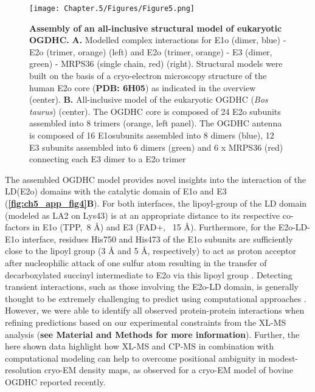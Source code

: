 \begin{figure}[p]
	\centering
	\texttt{[image: Chapter.5/Figures/Figure5.png]}
	\caption{\textbf{Assembly of an all-inclusive structural model of eukaryotic OGDHC.} \textbf{A.} Modelled complex interactions for E1o (dimer, blue) - E2o (trimer, orange) (left) and E2o (trimer, orange) - E3 (dimer, green) - MRPS36 (single chain, red) (right). Structural models were built on the basis of a cryo-electron microscopy structure of the human E2o core \cite{Nagy_2021} (\textbf{PDB: 6H05}) as indicated in the overview (center). \textbf{B.}  All-inclusive model of the eukaryotic OGDHC (\emph{Bos taurus}) (center). The OGDHC core is composed of 24 E2o subunits assembled into 8 trimers (orange, left panel). The OGDHC antenna is composed of 16 E1osubunits assembled into 8 dimers (blue), 12 E3 subunits assembled into 6 dimers (green) and 6 x MRPS36 (red) connecting each E3 dimer to a E2o trimer}
	\label{fig:ch5_fig5}
\end{figure}
The assembled OGDHC model provides novel insights into the interaction of the LD(E2o) domains with the catalytic domain of E1o and E3 (\textbf{\autoref{fig:ch5_app_fig4}B}). For both interfaces, the lipoyl-group of the LD domain (modeled as LA2 on Lys43) is at an appropriate distance to its respective co-factors in E1o (TPP,~8 Å) and E3 (FAD+, ~15 Å). Furthermore, for the E2o-LD-E1o interface, residues His750 and His473 of the E1o subunits are sufficiently close to the lipoyl group (3 Å and 5 Å, respectively) to act as proton acceptor after nucleophilic attack of one sulfur atom resulting in the transfer of decarboxylated succinyl intermediate to E2o via this lipoyl group \cite{Nemeria_2021, Pan_1998}. Detecting transient interactions, such as those involving the E2o-LD domain, is generally thought to be extremely challenging to predict using computational approaches \cite{Perrakis_2021}. However, we were able to identify all observed protein-protein interactions when refining predictions based on our experimental constraints from the XL-MS analysis (\textbf{see Material and Methods for more information}). Further, the here shown data highlight how XL-MS and CP-MS in combination with computational modeling can help to overcome positional ambiguity in modest-resolution cryo-EM density maps, as observed for a cryo-EM model of bovine OGDHC reported recently\cite{Liu_2022}.
%
